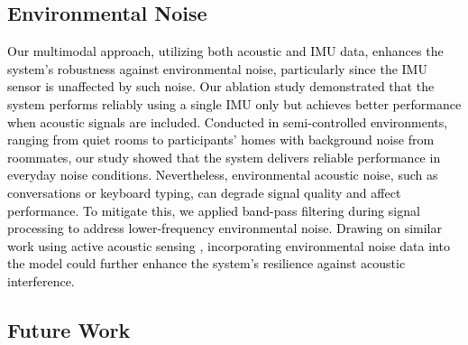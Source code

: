 \subsection{Environmental Noise}
\textcolor{black}{Our multimodal approach, utilizing both acoustic and IMU data, enhances the system's robustness against environmental noise, particularly since the IMU sensor is unaffected by such noise. Our ablation study demonstrated that the system performs reliably using a single IMU only but achieves better performance when acoustic signals are included. Conducted in semi-controlled environments, ranging from quiet rooms to participants' homes with background noise from roommates, our study showed that the system delivers reliable performance in everyday noise conditions. Nevertheless, environmental acoustic noise, such as conversations or keyboard typing, can degrade signal quality and affect performance. To mitigate this, we applied band-pass filtering during signal processing to address lower-frequency environmental noise. Drawing on similar work using active acoustic sensing \cite{yu2024ring, lee2024echowrist, zhang2023echospeech, li2022eario}, incorporating environmental noise data into the model could further enhance the system's resilience against acoustic interference.}

\subsection{Future Work}
\label{future}


